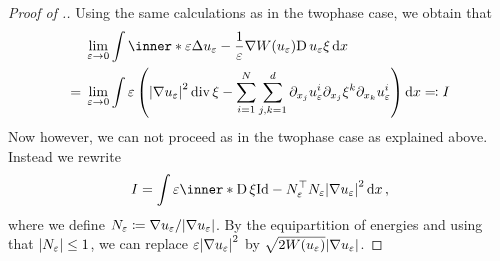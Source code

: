 \begin{proof}[Proof of .]
	Using the same calculations as in the twophase case, we obtain that
	\begin{align*}
		& \lim_{ \varepsilon \to 0 }
		\int
		\inner*{
			\varepsilon \Delta u_{ \varepsilon }
			-
			\frac{ 1 }{ \varepsilon } \nabla W ( u_{ \varepsilon } )
		}
		{
			\diff u_{ \varepsilon } \xi
		}
		\dd{ x }
		\\
		={} &
		\lim_{ \varepsilon \to 0 }
		\int
		\varepsilon
		\left(
		\abs{ \nabla u_{ \varepsilon } }^{ 2 }
		\divg \xi 
		-
		\sum_{ i = 1 }^{ N }
		\sum_{ j, k = 1 }^{ d }
		\partial_{ x_{ j } } u_{ \varepsilon }^{ i }
		\partial_{ x_{ j } } \xi^{ k }
		\partial_{ x_{ k } } u_{ \varepsilon }^{ i }
		\right)
		\dd{ x } 
		\eqqcolon I
	\end{align*}
	Now however, we can not proceed as in the twophase case as explained above. 
	Instead we rewrite
	\begin{equation}
		\label{key_equality_for_ptw_estimate}
		I
		=
		\int
		\varepsilon
		\inner*{
			\diff \xi 
		}
		{
			\mathrm{Id} - N_{ \varepsilon }^{ \top } N_{ \varepsilon }
		}
		\abs{ \nabla u_{ \varepsilon } }^{ 2 }
		\dd{ x },
	\end{equation}
	where we define $ N_{ \varepsilon } \coloneqq \nabla u_{ \varepsilon } / 
	\abs{ \nabla u_{ \varepsilon } } $. By the equipartition of energies 
	 and using that $ \abs{N_{ 
	\varepsilon } } \leq 1 $, we can replace $ \varepsilon \abs{ \nabla u_{ 
	\varepsilon } }^{ 2 } $ by $ \sqrt{ 2 W ( u_{ \varepsilon } ) } \abs{ 
	\nabla u_{ \varepsilon  } } $. 
	

\end{proof}
